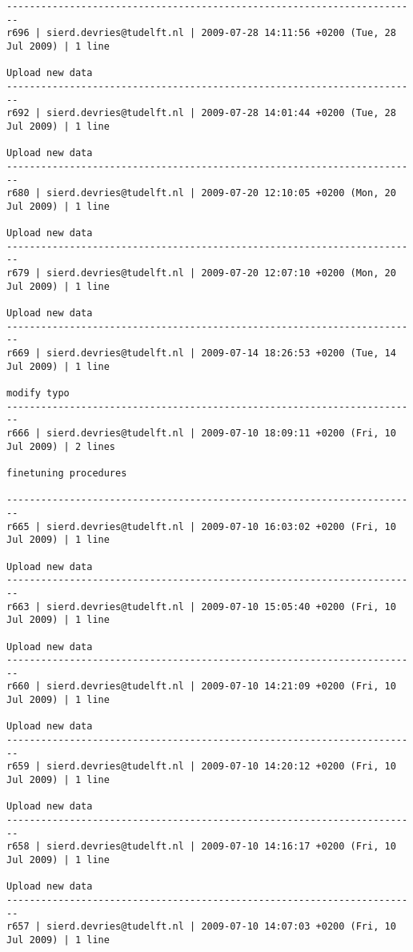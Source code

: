 \documentclass[9]{report}
\begin{document}
\begin{description}
\begin{verbatim}
------------------------------------------------------------------------
r696 | sierd.devries@tudelft.nl | 2009-07-28 14:11:56 +0200 (Tue, 28 Jul 2009) | 1 line

Upload new data
------------------------------------------------------------------------
r692 | sierd.devries@tudelft.nl | 2009-07-28 14:01:44 +0200 (Tue, 28 Jul 2009) | 1 line

Upload new data
------------------------------------------------------------------------
r680 | sierd.devries@tudelft.nl | 2009-07-20 12:10:05 +0200 (Mon, 20 Jul 2009) | 1 line

Upload new data
------------------------------------------------------------------------
r679 | sierd.devries@tudelft.nl | 2009-07-20 12:07:10 +0200 (Mon, 20 Jul 2009) | 1 line

Upload new data
------------------------------------------------------------------------
r669 | sierd.devries@tudelft.nl | 2009-07-14 18:26:53 +0200 (Tue, 14 Jul 2009) | 1 line

modify typo
------------------------------------------------------------------------
r666 | sierd.devries@tudelft.nl | 2009-07-10 18:09:11 +0200 (Fri, 10 Jul 2009) | 2 lines

finetuning procedures

------------------------------------------------------------------------
r665 | sierd.devries@tudelft.nl | 2009-07-10 16:03:02 +0200 (Fri, 10 Jul 2009) | 1 line

Upload new data
------------------------------------------------------------------------
r663 | sierd.devries@tudelft.nl | 2009-07-10 15:05:40 +0200 (Fri, 10 Jul 2009) | 1 line

Upload new data
------------------------------------------------------------------------
r660 | sierd.devries@tudelft.nl | 2009-07-10 14:21:09 +0200 (Fri, 10 Jul 2009) | 1 line

Upload new data
------------------------------------------------------------------------
r659 | sierd.devries@tudelft.nl | 2009-07-10 14:20:12 +0200 (Fri, 10 Jul 2009) | 1 line

Upload new data
------------------------------------------------------------------------
r658 | sierd.devries@tudelft.nl | 2009-07-10 14:16:17 +0200 (Fri, 10 Jul 2009) | 1 line

Upload new data
------------------------------------------------------------------------
r657 | sierd.devries@tudelft.nl | 2009-07-10 14:07:03 +0200 (Fri, 10 Jul 2009) | 1 line


\end{verbatim}
\end{description}
\end{document}
